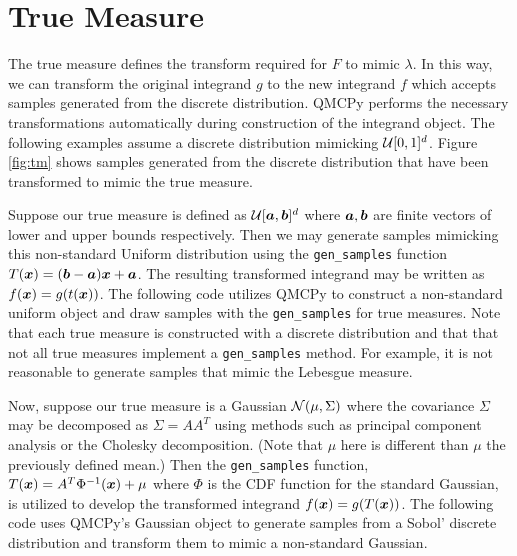\documentclass[graybox,footinfo]{svmult}
\begin{document}
\section{True Measure}

The true measure defines the transform required for $F$ to mimic $\lambda$. In this way, we can transform the original integrand $g$ to the new integrand $f$ which accepts samples generated from the discrete distribution. QMCPy performs the necessary transformations automatically during construction of the integrand object. The following examples assume a discrete distribution mimicking ${\mathcal{U}}[0,1]^d$. Figure \ref{fig:tm} shows samples generated from the discrete distribution that have been transformed to mimic the true measure.

Suppose our true measure is defined as ${\mathcal{U}}[{\boldsymbol{a}},{\boldsymbol{b}}]^d$ where ${\boldsymbol{a}},{\boldsymbol{b}}$ are finite vectors of lower and upper bounds respectively. Then we may generate samples mimicking this non-standard Uniform distribution using the \texttt{gen\_samples} function $T({\boldsymbol{x}}) = ({\boldsymbol{b}}-{\boldsymbol{a}}){\boldsymbol{x}} + {\boldsymbol{a}}$. The resulting transformed integrand may be written as $f({\boldsymbol{x}}) = g(t({\boldsymbol{x}}))$. The following code utilizes QMCPy to construct a non-standard uniform object and draw samples with the \texttt{gen\_samples} for true measures.  Note that each true measure is constructed with a discrete distribution and that that not all true measures implement a \texttt{gen\_samples} method. For example, it is not reasonable to generate samples that mimic the Lebesgue measure. 




Now, suppose our true measure is a Gaussian ${\mathcal{N}}(\mu,\Sigma)$ where the covariance $\Sigma$ may be decomposed as $\Sigma=AA^T$ using methods such as principal component analysis or the Cholesky decomposition. (Note that $\mu$ here is different than $\mu$ the previously defined mean.) Then the \texttt{gen\_samples} function, $T({\boldsymbol{x}}) = A^T \Phi^{-1}({\boldsymbol{x}}) + \mu$ where $\Phi$ is the CDF function for the standard Gaussian, is utilized to develop the transformed integrand $f({\boldsymbol{x}}) = g(T({\boldsymbol{x}}))$. The following code uses QMCPy's Gaussian object to generate samples from a Sobol' discrete distribution and transform them to mimic a non-standard Gaussian.   


\end{document}
